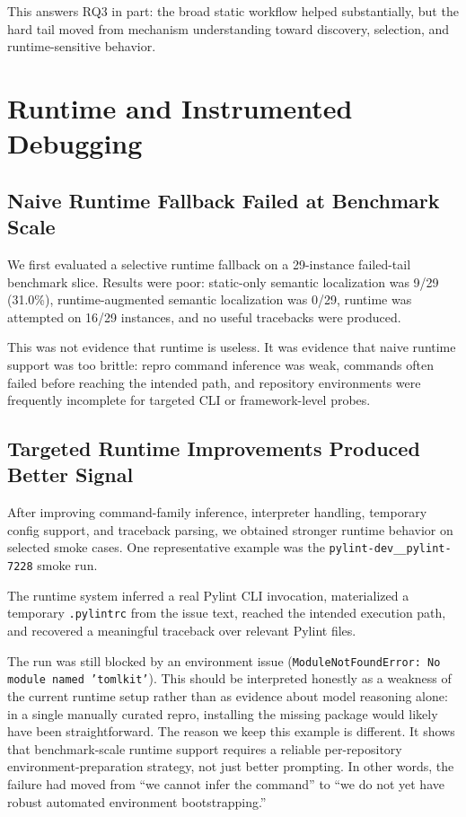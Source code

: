 \documentclass[11pt]{article}
\begin{document}
This answers RQ3 in part: the broad static workflow helped substantially, but the hard tail moved from mechanism understanding toward discovery, selection, and runtime-sensitive behavior.

\section{Runtime and Instrumented Debugging}

\subsection{Naive Runtime Fallback Failed at Benchmark Scale}

We first evaluated a selective runtime fallback on a 29-instance failed-tail benchmark slice. Results were poor: static-only semantic localization was 9/29 (31.0\%), runtime-augmented semantic localization was 0/29, runtime was attempted on 16/29 instances, and no useful tracebacks were produced.

This was not evidence that runtime is useless. It was evidence that naive runtime support was too brittle: repro command inference was weak, commands often failed before reaching the intended path, and repository environments were frequently incomplete for targeted CLI or framework-level probes.

\subsection{Targeted Runtime Improvements Produced Better Signal}

After improving command-family inference, interpreter handling, temporary config support, and traceback parsing, we obtained stronger runtime behavior on selected smoke cases. One representative example was the \texttt{pylint-dev\_\_pylint-7228} smoke run.

The runtime system inferred a real Pylint CLI invocation, materialized a temporary \texttt{.pylintrc} from the issue text, reached the intended execution path, and recovered a meaningful traceback over relevant Pylint files.

The run was still blocked by an environment issue (\texttt{ModuleNotFoundError: No module named 'tomlkit'}). This should be interpreted honestly as a weakness of the current runtime setup rather than as evidence about model reasoning alone: in a single manually curated repro, installing the missing package would likely have been straightforward. The reason we keep this example is different. It shows that benchmark-scale runtime support requires a reliable per-repository environment-preparation strategy, not just better prompting. In other words, the failure had moved from ``we cannot infer the command'' to ``we do not yet have robust automated environment bootstrapping.''
\end{document}
